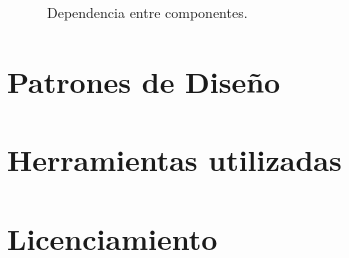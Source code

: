 \begin{figure}[H]
    \centering
    \caption{Dependencia entre componentes.}
    \label{figure:dependenciasComponentes}
\end{figure}

\section{Patrones de Diseño}

\section{Herramientas utilizadas}

\section{Licenciamiento}
